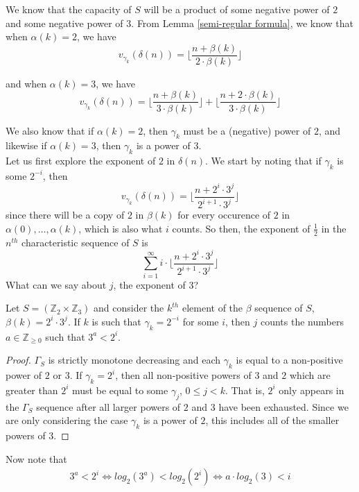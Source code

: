 We know that the capacity of $S$ will be a product of some negative power of $2$ and some negative power of $3$.  From Lemma \ref{semi-regular formula}, we know that when $\alpha(k)=2$, we have\\ 
\[v_{\gamma_k}(\delta(n)) = \lfloor \frac{n + \beta(k)}{2\cdot \beta(k)} \rfloor\]

and when $\alpha(k)=3$, we have\\
\[v_{\gamma_k}(\delta(n)) = \lfloor \frac{n + \beta(k)}{3\cdot \beta(k)} \rfloor + \lfloor \frac{n + 2\cdot \beta(k)}{3\cdot \beta(k)} \rfloor \]

We also know that if $\alpha(k)=2$, then $\gamma_k$ must be a (negative) power of $2$, and likewise if $\alpha(k)=3$, then $\gamma_k$ is a power of $3$.\\

 Let us first explore the exponent of $2$ in $\delta(n)$. We start by noting that if $\gamma_k$ is some $2^{-i}$, then \[v_{\gamma_k}(\delta(n)) =\lfloor \frac{n + 2^i\cdot 3 ^j}{2^{i+1} \cdot 3^j} \rfloor \] since there will be a copy of $2$ in $\beta(k)$ for every occurence of $2$ in $\alpha(0),\ldots,\alpha(k)$, which is also what $i$ counts. So then, the exponent of $\frac{1}{2}$ in the $n^{th}$ characteristic sequence of $S$ is \[ \sum_{i=1}^\infty i \cdot \lfloor\frac{n + 2^i \cdot 3^j}{2^{i+1}\cdot 3^j} \rfloor\] What can we say about $j$, the exponent of $3$?\\ 

\begin{lemma}
Let $S = (\mathbb{Z}_{2} \times \mathbb{Z}_{3}) $ and consider the $k^{th}$ element of the $\beta$ sequence of $S$, $\beta(k) = 2^i \cdot 3^j$. If $k$ is such that $\gamma_k=2^{-i}$ for some $i$, then $j$ counts the numbers $a \in \mathbb{Z}_{\geq 0}$ such that $3^a < 2^{i}$.
\end{lemma}

\begin{proof}
$\Gamma_S$ is strictly monotone decreasing and each $\gamma_k$ is equal to a non-positive power of $2$ or $3$. If $\gamma_k = 2^i$, then all non-positive powers of $3$ and $2$ which are greater than $2^i$ must be equal to some $\gamma_j$, $0 \leq j < k$. That is, $2^i$ only appears in the $\Gamma_S$ sequence after all larger powers of $2$ and $3$ have been exhausted. Since we are only considering the case $\gamma_k$ is a power of $2$, this includes all of the smaller powers of $3$.
\end{proof}

 Now note that\\ 
\begin{align*}
3^a < 2^i
 \iff
 log_2(3^a) < log_2(2^i)
\iff  
a \cdot log_2(3) < i
\end{align*}

